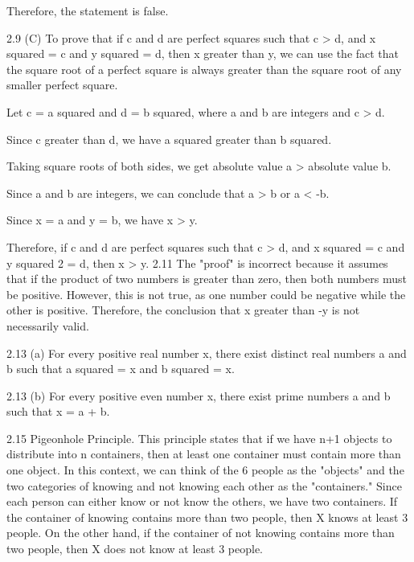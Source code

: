 \documentclass{article}
\begin{document}
Therefore, the statement is false.


2.9 (C)  To prove that if c and d are perfect squares such that c > d, and x squared = c and y squared = d, then x greater than y, we can use the fact that the square root of a perfect square is always greater than the square root of any smaller perfect square.

Let c = a squared and d = b squared, where a and b are integers and c > d.

Since c greater than  d, we have a squared greater than b squared.

Taking square roots of both sides, we get absolute value a  > absolute value b.

Since a and b are integers, we can conclude that a > b or a < -b.

Since x = a and y = b, we have x > y.

Therefore, if c and d are perfect squares such that c > d, and x squared = c and y squared 2 = d, then x > y.
2.11 The "proof" is incorrect because it assumes that if the product of two numbers is greater than zero, then both numbers must be positive. However, this is not true, as one number could be negative while the other is positive. Therefore, the conclusion that x greater than -y is not necessarily valid.

2.13 (a) For every positive real number x, there exist distinct real numbers a and b such that a squared = x and b squared = x.

2.13 (b) For every positive even number x, there exist prime numbers a and b such that x = a + b.

2.15 Pigeonhole Principle. This principle states that if we have n+1 objects to distribute into n containers, then at least one container must contain more than one object. In this context, we can think of the 6 people as the "objects" and the two categories of knowing and not knowing each other as the "containers." Since each person can either know or not know the others, we have two containers. If the container of knowing contains more than two people, then X knows at least 3 people. On the other hand, if the container of not knowing contains more than two people, then X does not know at least 3 people.
\end{document}
